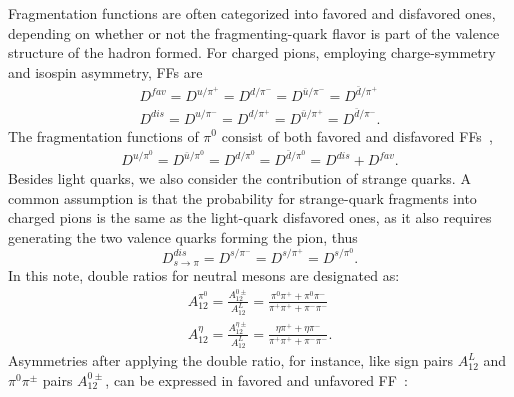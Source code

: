 Fragmentation functions are often categorized into favored and disfavored ones, depending on whether or not the fragmenting-quark flavor is part of the valence structure of the hadron formed. For charged pions, employing charge-symmetry and isospin asymmetry, FFs are 
\begin{equation}
\begin{aligned}
D^{fav}=D^{u/{\pi^+}}=D^{d/{\pi^-}}=D^{\bar{u}/{\pi^-}}=D^{\bar{d}/{\pi^+}}\\
D^{dis}=D^{u/{\pi^-}}=D^{d/{\pi^+}}=D^{\bar{u}/{\pi^+}}=D^{\bar{d}/{\pi^-}}.
\label{eqn:FF4}
\end{aligned}
\end{equation}
The fragmentation functions of $\pi^0$ consist of both favored and disfavored FFs~\cite{FoundationsofpQCD},
\begin{equation}
\begin{aligned}
D^{u/{\pi^0}}=D^{\bar{u}/{\pi^0}}=D^{d/{\pi^0}}=D^{\bar{d}/{\pi^0}}=D^{dis}+D^{fav}.
\label{eqn:FF4pi0}
\end{aligned}
\end{equation}
Besides light quarks, we also consider the contribution of strange quarks. A common assumption is that the probability for strange-quark fragments into charged pions is the same as the light-quark disfavored ones, as it also requires generating the two valence quarks forming the pion, thus
\begin{equation}
D^{dis}_{s\rightarrow\pi}=D^{s/{\pi^-}}=D^{s/{\pi^+}}=D^{s/{\pi^0}}.
\end{equation}
In this note, double ratios for neutral mesons are designated as:
\begin{equation}
\label{eqn:FF6}
\begin{aligned}
A_{12}^{\pi^0}=\frac{A^{0\pm}_{12}}{A^L_{12}}=\frac{\pi^0\pi^++\pi^0\pi^-}{\pi^+\pi^++\pi^-\pi^-}\\
A_{12}^{\eta}=\frac{A^{\eta\pm}_{12}}{A^L_{12}}=\frac{\eta\pi^++\eta\pi^-}{\pi^+\pi^++\pi^-\pi^-}.
\end{aligned}
\end{equation}
Asymmetries after applying the double ratio, for instance, like sign pairs $A^L_{12}$ and $\pi^0\pi^{\pm}$ pairs $A^{0\pm}_{12}$, can be expressed in favored and unfavored FF~\cite{ChargedPionResult}:

